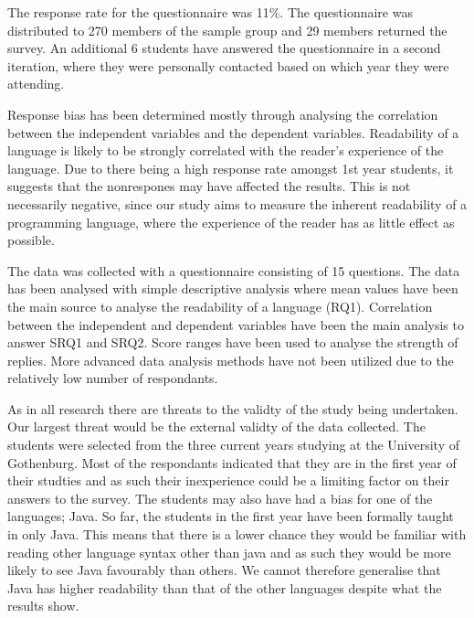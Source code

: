 \documentclass[times, 10pt,twocolumn]{IEEEtran}
\begin{document}
The response rate for the questionnaire was 11\%. The questionnaire was distributed to 270 members of the sample group and 29 members returned the survey. An additional 6 students have answered the questionnaire in a second iteration, where they were personally contacted based on which year they were attending. 
\newline

Response bias has been determined mostly through analysing the correlation between the independent variables and the dependent variables. Readability of a language is likely to be strongly correlated with the reader's experience of the language. Due to there being a high response rate amongst 1st year students, it suggests that the nonrespones may have affected the results. This is not necessarily negative, since our study aims to measure the inherent readability of a programming language, where the experience of the reader has as little effect as possible. 
\newline

The data was collected with a questionnaire consisting of 15 questions. The data has been analysed with simple descriptive analysis where mean values have been the main source to analyse the readability of a language (RQ1). Correlation between the independent and dependent variables have been the main analysis to answer SRQ1 and SRQ2. Score ranges have been used to analyse the strength of replies. More advanced data analysis methods have not been utilized due to the relatively low number of respondants. 

As in all research there are threats to the validty of the study being undertaken. Our largest threat would be the external validty of the data collected. The students were selected from the three current years studying at the University of Gothenburg. Most of the respondants indicated that they are in the first year of their studties and as such their inexperience could be a limiting factor on their answers to the survey. The students may also have had a bias for one of the languages; Java. So far, the students in the first year have been formally taught in only Java. This means that there is a lower chance they would be familiar with reading other language syntax other than java and as such they would be more likely to see Java favourably than others. We cannot therefore generalise that Java has higher readability than that of the other languages despite what the results show. 
\newline
\end{document}
